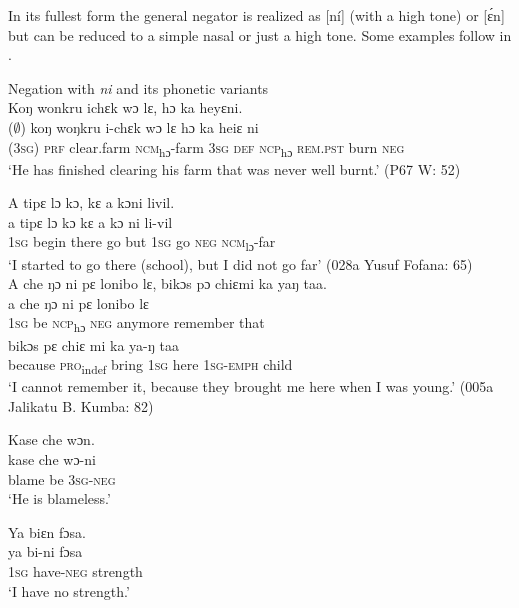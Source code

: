 In its fullest form the general negator is realized as [ní] (with a high tone) or [ɛ́n] but can be reduced to a simple nasal or just a high tone. Some examples follow in .

\ea%
    \label{ex:131}
    Negation with \textit{ni} and its phonetic variants\\
    \ea Koŋ wonkru ichɛk wɔ lɛ, hɔ ka heyɛni.\\
    \gll ($\emptyset$)  koŋ    woŋkru    i-chɛk      wɔ    lɛ    hɔ    ka      heiɛ  ni\\
    \textsc{(3sg)}  \textsc{prf}    clear.farm  \textsc{ncm}\textsubscript{hɔ}{}-farm    \textsc{3sg}  \textsc{def}  \textsc{ncp}\textsubscript{hɔ}  \textsc{rem.pst}  burn  \textsc{neg}\\
    \glt ‘He has finished clearing his farm that was never well burnt.' (P67 W: 52)

    \newpage
    \ex A tipɛ lɔ kɔ, kɛ a kɔni livil.\\
    \gll a    tipɛ    lɔ    kɔ    kɛ    a    kɔ    ni    li-vil\\
    \textsc{1sg}  begin    there  go    but  \textsc{1sg}  go    \textsc{neg}  \textsc{ncm}\textsubscript{lɔ}{}-far\\
    \glt ‘I started to go there (school), but I did not go far' (028a Yusuf Fofana: 65)\\

    \ex A che ŋɔ ni pɛ  lonibo lɛ, bikɔs pɔ chiɛmi ka yaŋ taa.\\
    \gll a    che  ŋɔ      ni    pɛ        lonibo    lɛ\\
    \textsc{1sg}  be    \textsc{ncp}\textsubscript{hɔ}    \textsc{neg}  anymore    remember  that\\
    \gll bikɔs    pɛ      chiɛ    mi    ka      ya-ŋ      taa\\
    because  \textsc{pro}\textsubscript{indef}  bring    \textsc{1sg}  here    \textsc{1sg-emph}  child\\
    \glt ‘I cannot remember it, because they brought me here when I was young.' (005a Jalikatu B. Kumba: 82)
    
    \ex Kase che wɔn.\\
    \gll kase    che  wɔ{}-ni\\
    blame  be    \textsc{3sg-neg}\\
    \glt ‘He is blameless.'

    \ex Ya biɛn fɔsa.\\
    \gll ya    bi-ni      fɔsa\\
    \textsc{1sg}  have-\textsc{neg}  strength\\
    \glt ‘I have no strength.'
\z
\z

